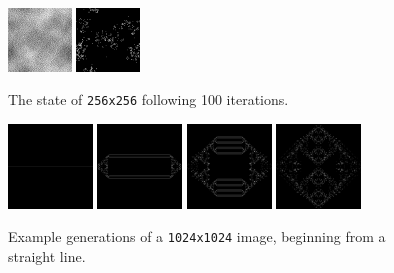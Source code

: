 \documentclass{article}
\begin{document}
    \begin{figure}[h]
        \begin{center}
            \includegraphics[width=0.15\textwidth]{test256.png}
            \includegraphics[width=0.15\textwidth]{testout256.png}
            \caption{The state of \texttt{256x256} following 100 iterations.}
            \label{fig:test256}
        \end{center}
    \end{figure}

    \begin{figure}[h]
        \begin{center}
            \includegraphics[width=0.2\textwidth]{test1024.png}
            \includegraphics[width=0.2\textwidth]{testout1024-1.png}
            \includegraphics[width=0.2\textwidth]{testout1024-2.png}
            \includegraphics[width=0.2\textwidth]{testout1024-3.png}
            \caption{Example generations of a \texttt{1024x1024} image, beginning from a straight line.}
            \label{fig:test1024}
        \end{center}
    \end{figure}
    
\end{document}
